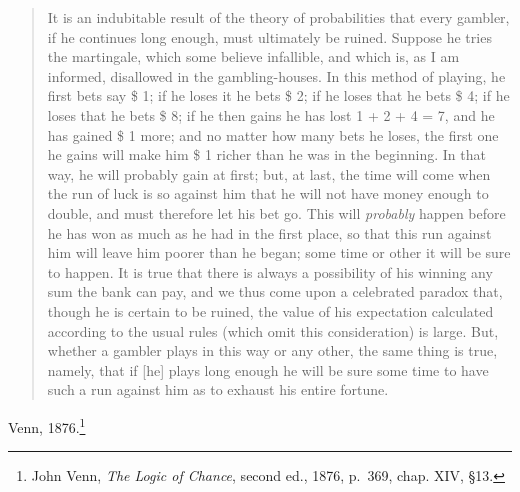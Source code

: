 \documentclass{article}
\begin{document}
\begin{quote}
It is an indubitable result of the theory of probabilities that every gambler, if he continues long enough, must ultimately be ruined. Suppose he tries the martingale, which some believe infallible, and which is, as I am informed, disallowed in the gambling-houses.
In this method of playing, he first bets say \$ 1; if he loses it he bets \$ 2; if he loses that he bets \$ 4; if he loses that he bets \$ 8; if he then gains he has lost 1 + 2 + 4 = 7,
and he has gained \$ 1 more; and no matter how many bets he loses, the first one he gains will make him \$ 1 richer than he was in the beginning. In that way,
he will probably gain at first; but, at last, the time will come when the run of luck is so against him that he will not have money enough to double, and must therefore let his bet go. This will {\em probably} happen before he has won as much as he had in the first place, so that this run against him will leave him poorer than he began; some time or other it will be sure to happen. It is true that there is always a possibility of his winning any sum the bank can pay, and we thus come upon a celebrated paradox that, though he is certain to be ruined, the value of his expectation calculated according to the usual rules (which omit this consideration) is large. But, whether a gambler plays in this way or any other, the same thing is true, namely, that if [he] plays long enough he will be sure some time to have such a run against him as to exhaust his entire fortune.
\end{quote}

Venn, 1876.\footnote{John Venn, {\em The Logic of Chance}, second ed., 1876, p.~369, chap. XIV, \S 13.}
\end{document}
